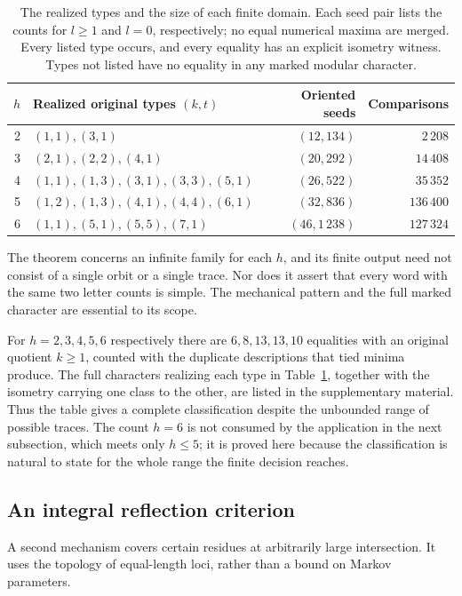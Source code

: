 \begin{table}[htbp]
\centering
\begin{tabular}{@{}rlrr@{}}
\toprule
$h$ & Realized original types $(k,t)$ & Oriented seeds & Comparisons\\
\midrule
2 & $(1,1), (3,1)$ & $(12,134)$ & $2\,208$\\
3 & $(2,1), (2,2), (4,1)$ & $(20,292)$ & $14\,408$\\
4 & $(1,1), (1,3), (3,1), (3,3), (5,1)$ & $(26,522)$ & $35\,352$\\
5 & $(1,2), (1,3), (4,1), (4,4), (6,1)$ & $(32,836)$ & $136\,400$\\
6 & $(1,1), (5,1), (5,5), (7,1)$ & $(46,1\,238)$ & $127\,324$\\
\bottomrule
\end{tabular}
\caption{The realized types and the size of each finite domain. Each seed pair lists the counts for $l\geqslant1$ and $l=0$, respectively; no equal numerical maxima are merged. Every listed type occurs, and every equality has an explicit isometry witness. Types not listed have no equality in any marked modular character.}
\label{tab:small-occurrences}
\end{table}

The theorem concerns an infinite family for each $h$, and its finite output need not consist of a single orbit or a single trace. Nor does it assert that every word with the same two letter counts is simple. The mechanical pattern and the full marked character are essential to its scope.

For $h=2,3,4,5,6$ respectively there are $6,8,13,13,10$ equalities with an original quotient $k\geqslant1$, counted with the duplicate descriptions that tied minima produce. The full characters realizing each type in Table~\ref{tab:small-occurrences}, together with the isometry carrying one class to the other, are listed in the supplementary material. Thus the table gives a complete classification despite the unbounded range of possible traces. The count $h=6$ is not consumed by the application in the next subsection, which meets only $h\leqslant5$; it is proved here because the classification is natural to state for the whole range the finite decision reaches.

\subsection{An integral reflection criterion}

A second mechanism covers certain residues at arbitrarily large intersection. It uses the topology of equal-length loci, rather than a bound on Markov parameters.

